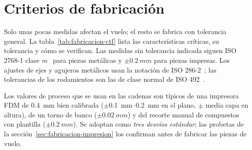 \section{Criterios de fabricación}\label{sec:fabricacion-criterios}

Solo unas pocas medidas afectan el vuelo; el resto se fabrica con tolerancia general. La
tabla~\ref{tab:fabricacion-ctf} lista las características críticas, su tolerancia y cómo
se verifican. Las medidas sin tolerancia indicada siguen ISO 2768-1 clase
\emph{m}~\cite{fabricacion-iso2768} para piezas metálicas y $\pm\SI{0.2}{mm}$ para piezas
impresas. Los ajustes de ejes y agujeros metálicos usan la notación de ISO
286-2~\cite{fabricacion-iso286}; las tolerancias de los rodamientos son las de clase
normal de ISO 492~\cite{fabricacion-iso492}.

Los valores de proceso que se usan en las cadenas son típicos de una impresora FDM de
\SI{0.4}{mm} bien calibrada ($\pm$\SIrange{0.1}{0.2}{mm} en el plano, $\pm$ media capa en
altura), de un torno de banco ($\pm\SI{0.02}{mm}$) y del recorte manual de compuestos con
plantilla ($\pm\SI{0.2}{mm}$). Se adoptan como \emph{tres desvíos estándar}; las
probetas de la sección~\ref{sec:fabricacion-impresion} los confirman antes de fabricar las
piezas de vuelo.

